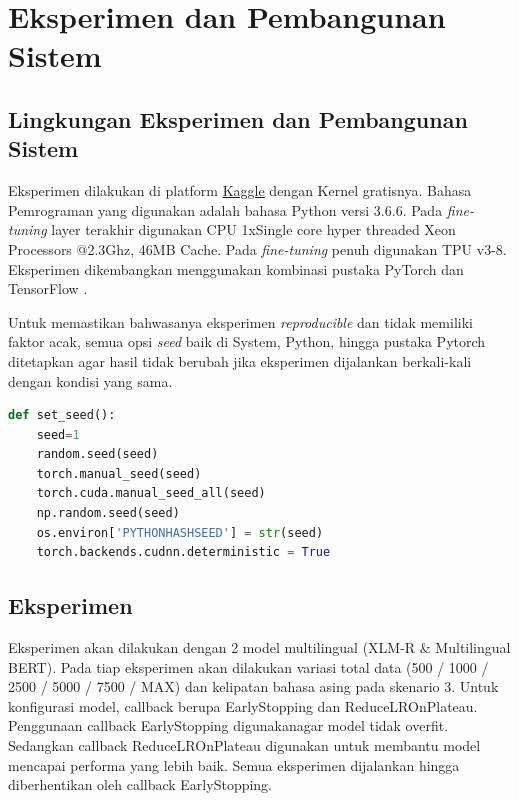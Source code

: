 \chapter{Eksperimen dan Pembangunan Sistem}

\section{Lingkungan Eksperimen dan Pembangunan Sistem}

Eksperimen dilakukan di platform \href{https://www.kaggle.com}{Kaggle} dengan Kernel gratisnya. Bahasa Pemrograman yang digunakan adalah bahasa Python versi 3.6.6. Pada \textit{fine-tuning} layer terakhir digunakan CPU 1xSingle core hyper threaded Xeon Processors @2.3Ghz, 46MB Cache. Pada \textit{fine-tuning} penuh digunakan TPU v3-8. Eksperimen dikembangkan menggunakan kombinasi pustaka PyTorch \parencite{paszke2017automatic} dan TensorFlow \parencite{tensorflow2015}.

Untuk memastikan bahwasanya eksperimen \textit{reproducible} dan tidak memiliki faktor acak, semua opsi \textit{seed} baik di System, Python, hingga pustaka Pytorch ditetapkan agar hasil tidak berubah jika eksperimen dijalankan berkali-kali dengan kondisi yang sama.

\begin{lstlisting}[language=Python]
def set_seed():
    seed=1
    random.seed(seed)
    torch.manual_seed(seed)
    torch.cuda.manual_seed_all(seed)
    np.random.seed(seed)
    os.environ['PYTHONHASHSEED'] = str(seed)
    torch.backends.cudnn.deterministic = True
\end{lstlisting}


\section{Eksperimen}
Eksperimen akan dilakukan dengan 2 model multilingual (XLM-R \& Multilingual BERT). Pada tiap eksperimen akan dilakukan variasi total data (500 / 1000 / 2500 / 5000 / 7500 / MAX) dan kelipatan bahasa asing pada skenario 3. Untuk konfigurasi model, callback berupa EarlyStopping dan ReduceLROnPlateau. Penggunaan callback EarlyStopping digunakanagar model tidak overfit. Sedangkan callback ReduceLROnPlateau digunakan untuk membantu model mencapai performa yang lebih baik. Semua eksperimen dijalankan hingga diberhentikan oleh callback EarlyStopping.


